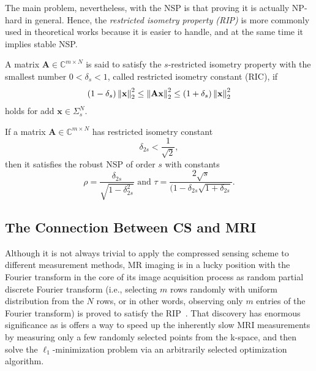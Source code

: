 The main problem, nevertheless, with the NSP is that proving it is actually NP-hard in general. Hence, the \textit{restricted isometry property (RIP)} is more commonly used in theoretical works because it is easier to handle, and at the same time it implies stable NSP.

\begin{definition}[RIP]
A matrix $\mathbf{A} \in \mathbb{C}^{m \times N}$ is said to satisfy the $s$-restricted isometry property with the smallest number $0 < \delta_s < 1$, called restricted isometry constant (RIC), if
\[(1 - \delta_s)\left\lVert\mathbf{x}\right\rVert_2^2 \le \left\lVert\mathbf{Ax}\right\rVert_2^2 \le (1 + \delta_s)\left\lVert\mathbf{x}\right\rVert_2^2\]
holds for add $\mathbf{x} \in \Sigma_s^N$.
\end{definition}

\begin{theorem}
If a matrix $\mathbf{A} \in \mathbb{C}^{m \times N}$ has restricted isometry constant 
\[\delta_{2s} < \frac{1}{\sqrt{2}},\] then it satisfies the robust NSP of order $s$ with constants
\[\rho = \frac{\delta_{2s}}{\sqrt{1 - \delta_{2s}^2}} \text{ and } \tau = \frac{2\sqrt{s}}{(1-\delta_{2s}\sqrt{1 + \delta_{2s}}}.\]
\end{theorem}

\subsection{The Connection Between CS and MRI}
Although it is not always trivial to apply the compressed sensing scheme to different measurement methods, MR imaging is in a lucky position with the Fourier transform in the core of its image acquisition process as random partial discrete Fourier transform (i.e., selecting $m$ rows randomly with uniform distribution from the $N$ rows, or in other words, observing only $m$ entries of the Fourier transform) is proved to satisfy the RIP~\cite{fornasier_theoretical_2010}. That discovery has enormous significance as is offers a way to speed up the inherently slow MRI measurements by measuring only a few randomly selected points from the k-space, and then solve the $\ell_1$-minimization problem via an arbitrarily selected optimization algorithm.

